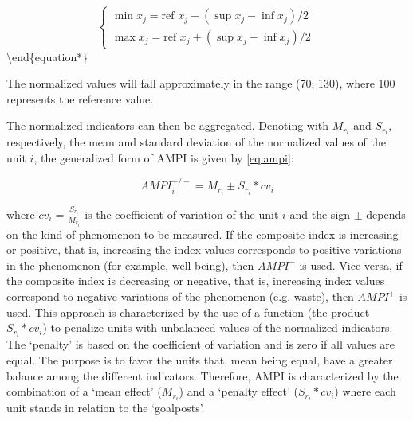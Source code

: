 \documentclass[
]{article}
\begin{document}
\begin{equation*}
    \begin{cases}
      \min x_j= \text{ref } x_j - (\sup x_j - \inf x_j)/2\\
      \max x_j= \text{ref } x_j + (\sup x_j - \inf x_j)/2
    \end{cases}\
\label{eq:goals}
\end{equation*}\textbackslash end\{equation*\}

The normalized values will fall approximately in the range (70; 130),
where 100 represents the reference value.

The normalized indicators can then be aggregated. Denoting with
\(M_{r_i}\) and \(S_{r_i}\), respectively, the mean and standard deviation
of the normalized values of the unit \(i\), the generalized form of AMPI
is given by \eqref{eq:ampi}:

\begin{equation}
AMPI_i^{+/-}=M_{r_i} \pm S_{r_i}*cv_i
\label{eq:ampi}
\end{equation}

where \(cv_i=\frac{S_{r_i}}{M_{r_i}}\) is the coefficient of variation of the
unit \(i\) and the sign \(\pm\) depends on the kind of phenomenon to be
measured. If the composite index is increasing or positive, that is,
increasing the index values corresponds to positive variations in the
phenomenon (for example, well-being), then \(AMPI^-\) is used. Vice versa,
if the composite index is decreasing or negative, that is, increasing
index values correspond to negative variations of the phenomenon (e.g.
waste), then \(AMPI^+\) is used. This approach is characterized by the use
of a function (the product \(S_{r_i}*cv_i\)) to penalize units with
unbalanced values of the normalized indicators. The `penalty' is based
on the coefficient of variation and is zero if all values are equal. The
purpose is to favor the units that, mean being equal, have a greater
balance among the different indicators. Therefore, AMPI is characterized
by the combination of a `mean effect' (\(M_{r_i}\)) and a `penalty effect'
(\(S_{r_i}*cv_i\)) where each unit stands in relation to the `goalposts'.
\end{document}
